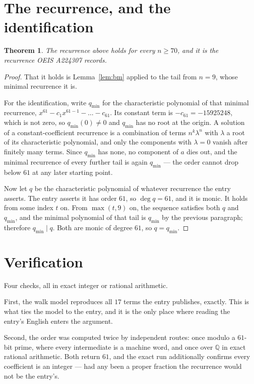 \documentclass[11pt,a4paper]{article}
\theoremstyle{plain}
\newtheorem{theorem}{Theorem}
\theoremstyle{definition}
\begin{document}
\section{The recurrence, and the identification}

\begin{theorem}
The recurrence above holds for every $n\ge70$, and it is the recurrence OEIS A224307 records.
\end{theorem}

\begin{proof}
That it holds is Lemma~\ref{lem:bm} applied to the tail from $n=9$, whose minimal
recurrence it is.

For the identification, write $q_{\min}$ for the characteristic polynomial of that minimal
recurrence, $x^{61}-c_1x^{61-1}-\dots-c_{61}$. Its constant term is
$-c_{61}=-15925248$, which is not zero, so $q_{\min}(0)\neq0$ and $q_{\min}$ has no
root at the origin. A solution of a constant-coefficient recurrence is a combination of terms
$n^{k}\lambda^{n}$ with $\lambda$ a root of its characteristic polynomial, and only the
components with $\lambda=0$ vanish after finitely many terms. Since $q_{\min}$ has none, no
component of $a$ dies out, and the minimal recurrence of every further tail is again
$q_{\min}$ --- the order cannot drop below $61$ at any later starting point.

Now let $q$ be the characteristic polynomial of whatever recurrence the entry asserts. The
entry asserts it has order $61$, so $\deg q=61$, and it is monic. It holds from some
index $t$ on. From $\max(t,9)$ on, the sequence satisfies both $q$ and $q_{\min}$, and
the minimal polynomial of that tail is $q_{\min}$ by the previous paragraph; therefore
$q_{\min}\mid q$. Both are monic of degree $61$, so $q=q_{\min}$.
\end{proof}

\section{Verification}

Four checks, all in exact integer or rational arithmetic.

First, the walk model reproduces all $17$ terms the entry publishes, exactly. This is
what ties the model to the entry, and it is the only place where reading the entry's English
enters the argument.

Second, the order was computed twice by independent routes: once modulo a $61$-bit prime, where
every intermediate is a machine word, and once over $\mathbb{Q}$ in exact rational arithmetic.
Both return $61$, and the exact run additionally confirms every coefficient is an integer
--- had any been a proper fraction the recurrence would not be the entry's.
\end{document}

